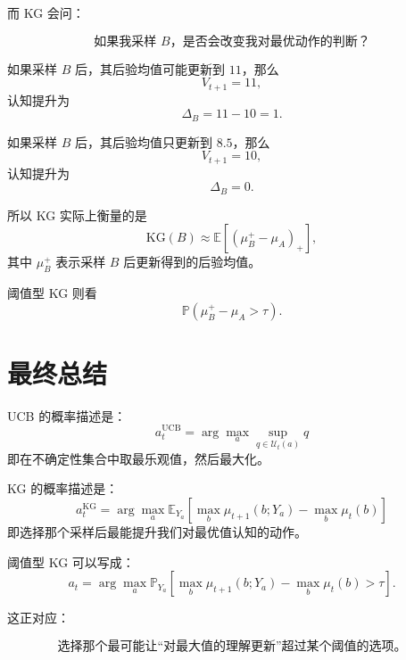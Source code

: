 \documentclass[UTF8,12pt]{ctexart}
\begin{document}
而 KG 会问：

\[
\text{如果我采样 }B\text{，是否会改变我对最优动作的判断？}
\]

如果采样 $B$ 后，其后验均值可能更新到 $11$，那么
\[
V_{t+1}=11,
\]
认知提升为
\[
\Delta_B=11-10=1.
\]

如果采样 $B$ 后，其后验均值只更新到 $8.5$，那么
\[
V_{t+1}=10,
\]
认知提升为
\[
\Delta_B=0.
\]

所以 KG 实际上衡量的是
\[
\mathrm{KG}(B)
\approx
\mathbb E
\left[
(\mu_B^+-\mu_A)_+
\right],
\]
其中 $\mu_B^+$ 表示采样 $B$ 后更新得到的后验均值。

阈值型 KG 则看
\[
\mathbb P
\left(
\mu_B^+-\mu_A>\tau
\right).
\]

\section{最终总结}

UCB 的概率描述是：
\[
\boxed{
a_t^{\mathrm{UCB}}
=
\arg\max_a
\sup_{q\in\mathcal U_t(a)}
q
}
\]
即在不确定性集合中取最乐观值，然后最大化。

KG 的概率描述是：
\[
\boxed{
a_t^{\mathrm{KG}}
=
\arg\max_a
\mathbb E_{Y_a}
\left[
\max_b \mu_{t+1}(b;Y_a)
-
\max_b \mu_t(b)
\right]
}
\]
即选择那个采样后最能提升我们对最优值认知的动作。

阈值型 KG 可以写成：
\[
\boxed{
a_t
=
\arg\max_a
\mathbb P_{Y_a}
\left[
\max_b \mu_{t+1}(b;Y_a)
-
\max_b \mu_t(b)
>
\tau
\right].
}
\]

这正对应：

\[
\boxed{
\text{选择那个最可能让“对最大值的理解更新”超过某个阈值的选项。}
}
\]
\end{document}
